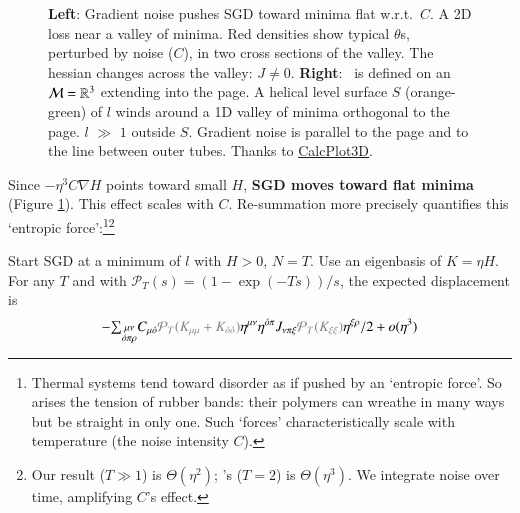 \begin{figure}%
    \centering
    \crunch\squash
    \caption{%
        \textbf{Left}:
        Gradient noise pushes SGD toward minima flat w.r.t.\ $C$.
            A 2D loss near
            a valley of minima.  Red densities show typical
            $\theta$s, perturbed by noise ($C$),
            in two cross sections of the valley.  The hessian
            changes across the valley: $J \neq 0$.  
        \textbf{Right}: \Helix\ is defined on an $\mathcal{M}=\mathbb{R}^3$ 
        extending into the page.  A helical
        level surface $S$ (orange-green) of $l$ winds around 
        a 1D valley of minima orthogonal to the
        page.  $l$ $\gg$ $1$ outside $S$.  Gradient noise
        is parallel to the page and to the line between outer tubes.
        Thanks to
        \href{https://www.monroecc.edu/faculty/paulseeburger/calcnsf/CalcPlot3D/}{CalcPlot3D}.
    }
    \label{fig:cubic}
    \crunch
\end{figure}
Since $-\eta^3 C\nabla H$ points toward small $H$, \textbf{SGD moves
toward flat minima} (Figure \ref{fig:cubic}).
This effect scales with $C$.  
%
%
Re-summation more precisely quantifies this `entropic force':\footnote{
    Thermal systems tend toward disorder as if pushed by an
    `entropic force'.
    So arises the tension of rubber
    bands: their polymers can wreathe in
    many ways but be straight in only one.
    Such `forces' characteristically 
    scale with
    temperature (the noise intensity $C$).
}\footnote{
    Our result ($T\gg 1$) is $\Theta(\eta^2)$; \cite{ya19b}'s
    ($T=2$) is $\Theta(\eta^3)$.  We
    integrate noise over time, amplifying $C$'s
    effect. 
}
%
\begin{cor}\label{cor:entropic}%
    Start SGD at a minimum of $l$ with $H>0$, $N=T$.  Use
    an eigenbasis of $K=\eta H$.  
    For any $T$ and
    with ${\mathcal P}_T(s) = (1 - \exp(-Ts))/s$,
    the 
    expected displacement is
    $$
        -
        {\textstyle\sum_{\substack{\mu\nu    \\ \omicron\pi\rho}}}
            C_{\mu\omicron}
            {\color{gray}{\mathcal P}_T(K_{\mu\mu} + K_{\omicron\omicron})}
            \eta^{\mu\nu}\eta^{\omicron\pi}
            J_{\nu\pi\xi}
            {\color{gray}{\mathcal P}_T(K_{\xi\xi})}\eta^{\xi\rho}/2
        + o(\eta^3)
        \squish\squish
    $$
\end{cor}

